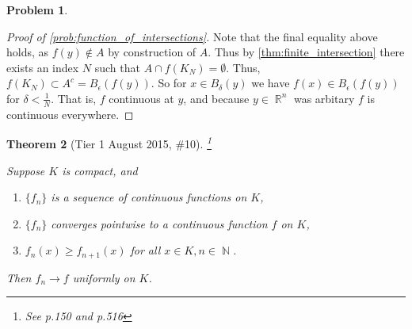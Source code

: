 \documentclass[english]{article}
\DeclareMathOperator{\R}{\mathbb{R}}
\DeclareMathOperator{\N}{\mathbb{N}}
\DeclareMathOperator{\<}{\langle}
\renewcommand{\>}{\rangle}
\newtheorem{theorem}{Theorem} %
\theoremstyle{definition}
\newtheorem{problem}[theorem]{Problem}
\begin{document}
\begin{problem}
\begin{proof}[Proof of \cref{prob:function_of_intersections}]
        Note that the final equality above holds, as $f(y) \not \in A$ by construction of $A$. Thus by \cref{thm:finite_intersection} there exists an index $N$ such that $A \cap f(K_N) = \emptyset$. Thus, $f(K_N) \subset A^c = B_{\epsilon}(f(y))$. So for $x \in B_{\delta}(y)$ we have $f(x) \in B_{\epsilon}(f(y))$ for $\delta < \frac{1}{N}$. That is, $f$ continuous at $y$, and because $y \in \R^n$ was arbitary $f$ is continuous everywhere. 
    \end{proof}
\end{problem}

\begin{theorem}[Tier 1 August 2015, \#10] \footnote{See \cite{rudin} p.150 and p.516}
    \label{thm:unif_convergence}

    Suppose $K$ is compact, and 
    \begin{enumerate}
        \item \label{enum:thm:unif_convergence_1} $\{f_n\}$ is a sequence of continuous functions on $K$,
        \item \label{enum:thm:unif_convergence_2} $\{f_n\}$ converges pointwise to a continuous function $f$ on $K$,
        \item \label{enum:thm:unif_convergence_3} $f_n(x) \geq f_{n + 1}(x)$ for all $x \in K, n \in \N$.
    \end{enumerate}

    Then $f_n \to f$ uniformly on $K$.
\end{theorem}
\end{document}

